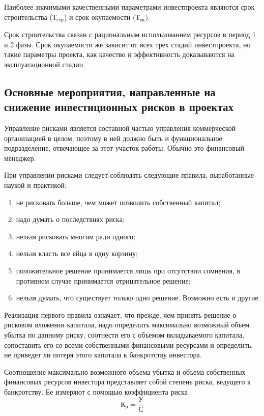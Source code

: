 Наиболее значимыми качественными параметрами инвестпроекта являются срок строительства ($\text{Т}_{\text{стр}}$) и срок окупаемости ($\text{Т}_{\text{ок}}$).

Срок строительства связан с рациональным использованием ресурсов в период 1 и 2 фазы. Срок окупаемости же зависит от всех трех стадий инвестпроекта, но такие параметры проекта, как качество и эффективность доказываются на эксплуатационной стадии \cite[с. 162--166]{sergeev}

\subsection{Основные мероприятия, направленные на снижение инвестиционных рисков в проектах}

Управление рисками является составной частью управления коммерческой организацией в целом, поэтому в ней должно быть и функциональное подразделение, отвечающее за этот участок работы.
Обычно это финансовый менеджер.

При управлении рисками следует соблюдать следующие правила, выработанные наукой и практикой:
\begin{enumerate}
	\setlength\itemsep{0pt}
	\item не рисковать больше, чем может позволить собственный капитал;
	\item надо думать о последствиях риска;
	\item нельзя рисковать многим ради одного;
	\item нельзя класть все яйца в одну корзину;
	\item положительное решение принимается лишь при отсутствии сомнения, в противном случае принимается отрицательное решение;
	\item нельзя думать, что существует только одно решение. Возможно есть и другие.
\end{enumerate}

Реализация первого правила означает, что прежде, чем принять решение о рисковом вложении капитала, надо определить максимально возможный объем убытка по данному риску, соотнести его с объемом вкладываемого капитала, сопоставить его со всеми собственными финансовыми ресурсами и определить, не приведет ли потеря этого капитала к банкротству инвестора.

Соотношение максимально возможного объема убытка и объема собственных финансовых ресурсов инвестора представляет собой степень риска, ведущего к банкротству.
Ее измеряют с помощью коэффициента риска
\[ \text{К}_\text{р} = \frac{\text{У}}{\text{С}} \]